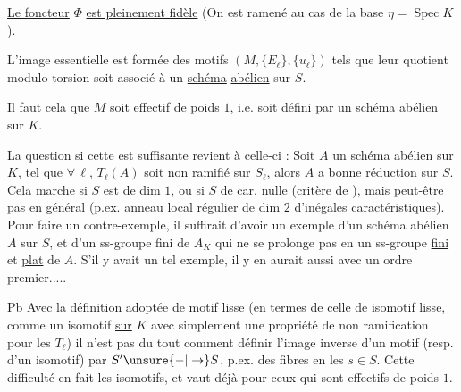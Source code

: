 \uline{Le foncteur} $\Phi$ \uline{est pleinement fidèle} (On est ramené au cas de la base $\eta=\operatorname{Spec}K$).

L'image essentielle est  formée des motifs $(M,\{E_\ell\},\{u_\ell\})$ tels que  leur quotient modulo torsion soit associé à un \uline{schéma} \uline{abélien} sur $S$.

Il \uline{faut} \uline{} cela que $M$ soit effectif de poids $1$, i.e. soit défini par un schéma abélien  sur $K$. 

La question si cette  est suffisante revient à celle-ci : Soit $A$ un schéma abélien sur $K$,  tel que $\forall\,\ell$,  $T_\ell(A)$ soit non ramifié sur $S_\ell$, alors $A$ a bonne réduction sur $S$. Cela marche si $S$ est de dim $1$, \uline{ou} si $S$ de car. nulle (critère de ), mais peut-être pas en général (p.ex. anneau local régulier de dim $2$ d'inégales caractéristiques). Pour faire un contre-exemple, il suffirait d'avoir un exemple d'un schéma abélien $A$ sur $S$, et d'un ss-groupe fini de $A_K$ qui ne se prolonge pas en un ss-groupe \uline{fini} et \uline{plat} de $A$. S'il y avait un tel exemple, il y en aurait aussi avec un ordre premier.....

\uline{Pb} Avec la définition adoptée de motif lisse (en termes de celle de isomotif lisse, comme un isomotif \uline{sur} $K$ avec simplement une propriété  de non ramification pour les $T_\ell$) il n'est pas du tout  comment définir l'image inverse d'un motif (resp. d'un isomotif) par $S'\unsure{\mathord{-}|\to}S$, p.ex. des fibres en les $s\in S$. Cette difficulté  en fait les isomotifs, et vaut déjà pour ceux qui sont effectifs de poids $1$.
